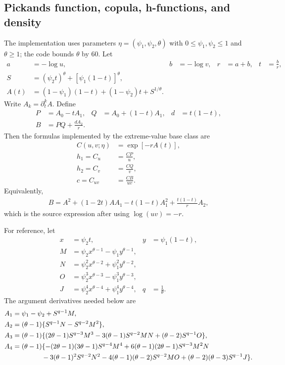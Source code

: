 \documentclass[10pt]{article}
\begin{document}
\subsection{Pickands function, copula, h-functions, and density}

The implementation uses parameters
$\eta=(\psi_1,\psi_2,\theta)$ with
$0\le\psi_1,\psi_2\le1$ and $\theta\ge1$; the code bounds $\theta$ by $60$.
Let
\begin{align*}
a&=-\log u,
&b&=-\log v,
&r&=a+b,
&t&=\frac{b}{r},\\
S&=(\psi_2t)^\theta+[\psi_1(1-t)]^\theta,\\
A(t)&=(1-\psi_1)(1-t)+(1-\psi_2)t+S^{1/\theta}.
\end{align*}
Write $A_k=\partial_t^k A$.  Define
\begin{align*}
P&=A_0-tA_1,
&Q&=A_0+(1-t)A_1,
&d&=t(1-t),\\
B&=PQ+\frac{dA_2}{r}.
\end{align*}
Then the formulas implemented by the extreme-value base class are
\begin{align*}
C(u,v;\eta)&=\exp[-rA(t)],\\
h_1=C_u&=\frac{CP}{u},\\
h_2=C_v&=\frac{CQ}{v},\\
c=C_{uv}&=\frac{CB}{uv}.
\end{align*}
Equivalently,
\begin{align*}
B
=A^2+(1-2t)AA_1-t(1-t)A_1^2+\frac{t(1-t)}{r}A_2,
\end{align*}
which is the source expression after using $\log(uv)=-r$.

For reference, let
\begin{align*}
x&=\psi_2t,
&y&=\psi_1(1-t),\\
M&=\psi_2x^{\theta-1}-\psi_1y^{\theta-1},\\
N&=\psi_2^2x^{\theta-2}+\psi_1^2y^{\theta-2},\\
O&=\psi_2^3x^{\theta-3}-\psi_1^3y^{\theta-3},\\
J&=\psi_2^4x^{\theta-4}+\psi_1^4y^{\theta-4},
&q&=\frac1\theta.
\end{align*}
The argument derivatives needed below are
\begin{align*}
A_1
&=\psi_1-\psi_2+S^{q-1}M,\\
A_2
&=(\theta-1)\{S^{q-1}N-S^{q-2}M^2\},\\
A_3
&=(\theta-1)\{(2\theta-1)S^{q-3}M^3
 -3(\theta-1)S^{q-2}MN
 +(\theta-2)S^{q-1}O\},\\
A_4
&=(\theta-1)\{-(2\theta-1)(3\theta-1)S^{q-4}M^4
 +6(\theta-1)(2\theta-1)S^{q-3}M^2N\\
&\hspace{4.3em}
 -3(\theta-1)^2S^{q-2}N^2
 -4(\theta-1)(\theta-2)S^{q-2}MO
 +(\theta-2)(\theta-3)S^{q-1}J\}.
\end{align*}
\end{document}
